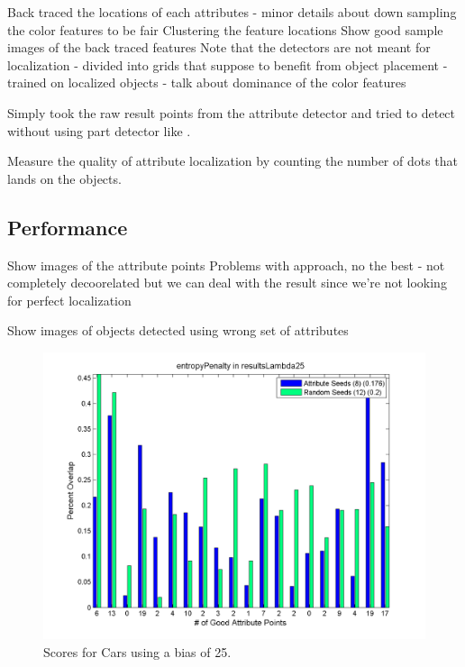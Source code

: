 \documentclass[10pt,twocolumn,letterpaper]{article}
\begin{document}
Back traced the locations of each attributes
- minor details about down sampling the color features to be fair
Clustering the feature locations
Show good sample images of the back traced features
Note that the detectors are not meant for localization
- divided into grids that suppose to benefit from object placement
- trained on localized objects
- talk about dominance of the color features

Simply took the raw result points from the attribute detector and tried to detect without using part detector like \cite{Farhadi2010}.

Measure the quality of attribute localization by counting the number of dots that lands on the objects.


\subsection{Performance}

Show images of the attribute points
Problems with approach, no the best
- not completely decoorelated but we can deal with the result since we're not looking for perfect localization

Show images of objects detected using wrong set of attributes




\begin{figure}[t]
\begin{center}
    \includegraphics[width=0.9\linewidth]{carscore}
    \caption{Scores for Cars using a bias of 25.}
\end{center}
\label{fig:scores}
\end{figure}

\end{document}
